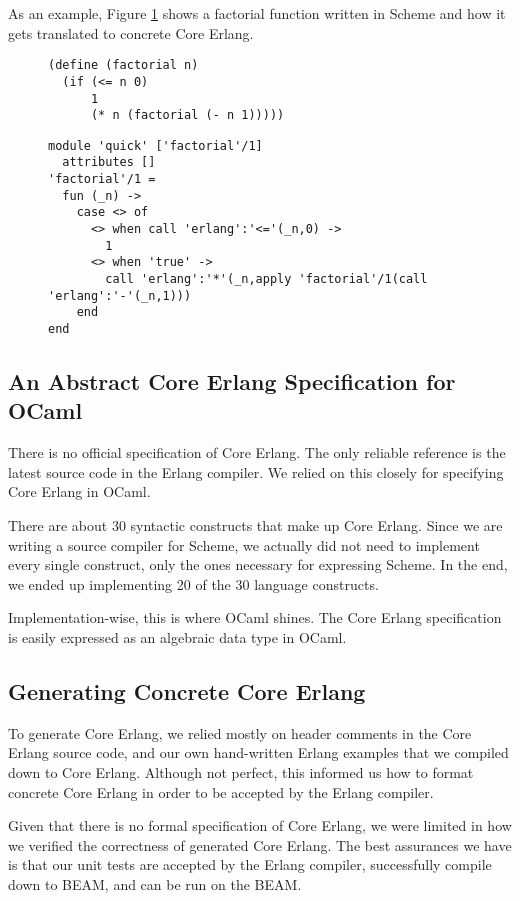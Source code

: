 As an example, Figure \ref{fig:factorial} shows a factorial function written in Scheme and how it gets translated to concrete Core Erlang. 

\begin{figure}[!h]
\begin{lstlisting}[caption={Factorial function written in Scheme.},captionpos=b,frame=single,xleftmargin=1em]
(define (factorial n)
  (if (<= n 0)
      1
      (* n (factorial (- n 1)))))
\end{lstlisting}
\begin{lstlisting}[caption={Scheme factorial function translated to Core Erlang.},captionpos=b,frame=single,xleftmargin=1em]
module 'quick' ['factorial'/1]
  attributes []
'factorial'/1 =
  fun (_n) ->
    case <> of 
      <> when call 'erlang':'<='(_n,0) ->
        1
      <> when 'true' ->
        call 'erlang':'*'(_n,apply 'factorial'/1(call 'erlang':'-'(_n,1)))
    end
end
\end{lstlisting}
\label{fig:factorial}
\end{figure}

\subsection{An Abstract Core Erlang Specification for OCaml}

There is no official specification of Core Erlang.
The only reliable reference is the latest source code in the Erlang compiler. 
We relied on this closely for specifying Core Erlang in OCaml. 

There are about 30 syntactic constructs that make up Core Erlang. 
Since we are writing a source compiler for Scheme, we actually did not need to implement every single construct, only the ones necessary for expressing Scheme.
In the end, we ended up implementing 20 of the 30 language constructs. 

Implementation-wise, this is where OCaml shines. 
The Core Erlang specification is easily expressed as an algebraic data type in OCaml. 

\subsection{Generating Concrete Core Erlang}

To generate Core Erlang, we relied mostly on header comments in the Core Erlang source code, and our own hand-written Erlang examples that we compiled down to Core Erlang. 
Although not perfect, this informed us how to format concrete Core Erlang in order to be accepted by the Erlang compiler. 

Given that there is no formal specification of Core Erlang, we were limited in how we verified the correctness of generated Core Erlang. 
The best assurances we have is that our unit tests are accepted by the Erlang compiler, successfully compile down to BEAM, and can be run on the BEAM. 
